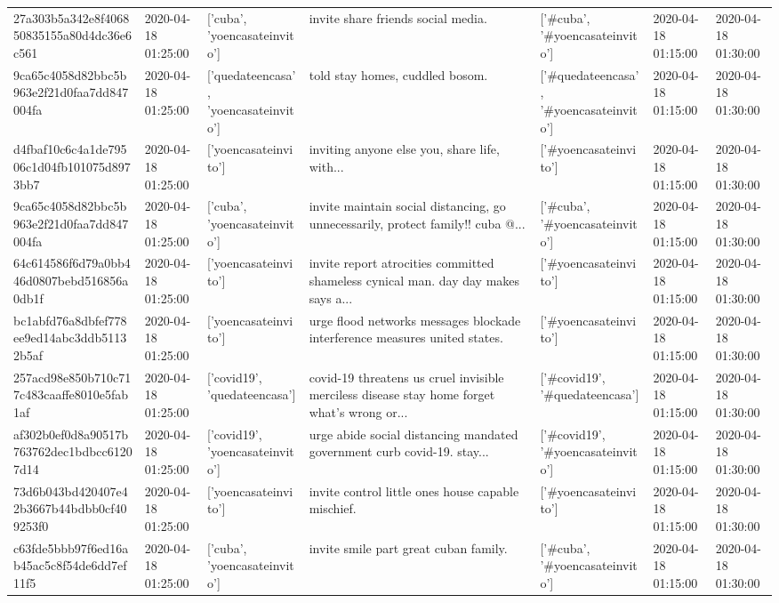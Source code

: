 \begin{tabular}{lllllll}
27a303b5a342e8f406850835155a80d4dc36e6c561 & 2020-04-18 01:25:00 & ['cuba', 'yoencasateinvito'] & invite share friends social media. & ['#cuba', '#yoencasateinvito'] & 2020-04-18 01:15:00 & 2020-04-18 01:30:00 \\
9ca65c4058d82bbc5b963e2f21d0faa7dd847004fa & 2020-04-18 01:25:00 & ['quedateencasa', 'yoencasateinvito'] & told stay homes, cuddled bosom. & ['#quedateencasa', '#yoencasateinvito'] & 2020-04-18 01:15:00 & 2020-04-18 01:30:00 \\
d4fbaf10c6c4a1de79506c1d04fb101075d8973bb7 & 2020-04-18 01:25:00 & ['yoencasateinvito'] & inviting anyone else you, share life, with... & ['#yoencasateinvito'] & 2020-04-18 01:15:00 & 2020-04-18 01:30:00 \\
9ca65c4058d82bbc5b963e2f21d0faa7dd847004fa & 2020-04-18 01:25:00 & ['cuba', 'yoencasateinvito'] & invite maintain social distancing, go unnecessarily, protect family!!️ cuba @... & ['#cuba', '#yoencasateinvito'] & 2020-04-18 01:15:00 & 2020-04-18 01:30:00 \\
64c614586f6d79a0bb446d0807bebd516856a0db1f & 2020-04-18 01:25:00 & ['yoencasateinvito'] & invite report atrocities committed shameless cynical man. day day makes says a... & ['#yoencasateinvito'] & 2020-04-18 01:15:00 & 2020-04-18 01:30:00 \\
bc1abfd76a8dbfef778ee9ed14abc3ddb51132b5af & 2020-04-18 01:25:00 & ['yoencasateinvito'] & urge flood networks messages blockade interference measures united states. & ['#yoencasateinvito'] & 2020-04-18 01:15:00 & 2020-04-18 01:30:00 \\
257acd98e850b710c717c483caaffe8010e5fab1af & 2020-04-18 01:25:00 & ['covid19', 'quedateencasa'] & covid-19 threatens us cruel invisible merciless disease stay home forget what's wrong or... & ['#covid19', '#quedateencasa'] & 2020-04-18 01:15:00 & 2020-04-18 01:30:00 \\
af302b0ef0d8a90517b763762dec1bdbcc61207d14 & 2020-04-18 01:25:00 & ['covid19', 'yoencasateinvito'] & urge abide social distancing mandated government curb covid-19. stay... & ['#covid19', '#yoencasateinvito'] & 2020-04-18 01:15:00 & 2020-04-18 01:30:00 \\
73d6b043bd420407e42b3667b44bdbb0cf409253f0 & 2020-04-18 01:25:00 & ['yoencasateinvito'] & invite control little ones house capable mischief. & ['#yoencasateinvito'] & 2020-04-18 01:15:00 & 2020-04-18 01:30:00 \\
c63fde5bbb97f6ed16ab45ac5c8f54de6dd7ef11f5 & 2020-04-18 01:25:00 & ['cuba', 'yoencasateinvito'] & invite smile part great cuban family. & ['#cuba', '#yoencasateinvito'] & 2020-04-18 01:15:00 & 2020-04-18 01:30:00 \\

\end{tabular}
